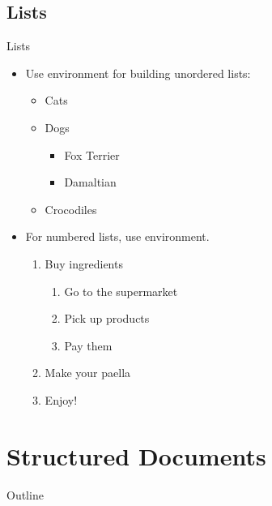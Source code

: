 \documentclass{beamer}
\begin{document}
\subsection*{Lists}
\begin{frame}[fragile]{Lists}
\begin{itemize}
\item Use  environment for building unordered lists:

\begin{exampletwouptiny}
\begin{itemize}
\item Cats
\item Dogs
  \begin{itemize}
    \item Fox Terrier
    \item Damaltian
  \end{itemize}
\item Crocodiles
\end{itemize}
\end{exampletwouptiny}

\item For numbered lists, use  environment.

\begin{exampletwouptiny}
\begin{enumerate}
\item Buy ingredients
  \begin{enumerate}
    \item Go to the supermarket
    \item Pick up products
    \item Pay them
  \end{enumerate}
\item Make your paella
\item Enjoy!
\end{enumerate}
\end{exampletwouptiny}

\end{itemize}

\end{frame}

\section{Structured Documents}

\begin{frame}{Outline}
\tableofcontents[currentsection]
\end{frame}
\end{document}
